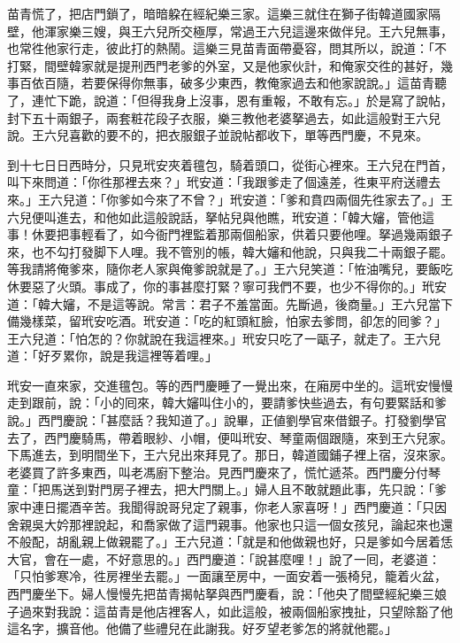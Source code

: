 苗青慌了，把店門鎖了，暗暗躱在經紀樂三家。這樂三就住在獅子街韓道國家隔壁，他渾家樂三嫂，與王六兒所交極厚，常過王六兒這邊來做伴兒。王六兒無事，也常徃他家行走，彼此打的熱鬧。這樂三見苗青面帶憂容，問其所以，說道：「不打緊，間壁韓家就是提刑西門老爹的外室，又是他家伙計，和俺家交徃的甚好，幾事百依百隨，若要保得你無事，破多少東西，教俺家過去和他家說說。」這苗青聽了，連忙下跪，說道：「但得我身上沒事，恩有重報，不敢有忘。」於是寫了說帖，封下五十兩銀子，兩套粧花段子衣服，樂三教他老婆拏過去，如此這般對王六兒說。王六兒喜歡的要不的，把衣服銀子並說帖都收下，單等西門慶，不見來。

到十七日日西時分，只見玳安夾着氊包，騎着頭口，從街心裡來。王六兒在門首，叫下來問道：「你徃那裡去來？」玳安道：「我跟爹走了個遠差，徃東平府送禮去來。」王六兒道：「你爹如今來了不曾？」玳安道：「爹和賁四兩個先徃家去了。」王六兒便叫進去，和他如此這般說話，拏帖兒與他瞧，玳安道：「韓大嬸，管他這事！休要把事輕看了，如今衙門裡監着那兩個船家，供着只要他哩。拏過幾兩銀子來，也不勾打發脚下人哩。我不管別的帳，韓大嬸和他說，只與我二十兩銀子罷。等我請將俺爹來，隨你老人家與俺爹說就是了。」王六兒笑道：「恠油嘴兒，要飯吃休要惡了火頭。事成了，你的事甚麼打緊？寧可我們不要，也少不得你的。」玳安道：「韓大嬸，不是這等說。常言：君子不羞當面。先斷過，後商量。」王六兒當下備幾樣菜，留玳安吃酒。玳安道：「吃的紅頭紅臉，怕家去爹問，卻怎的囘爹？」王六兒道：「怕怎的？你就說在我這裡來。」玳安只吃了一甌子，就走了。王六兒道：「好歹累你，說是我這裡等着哩。」

玳安一直來家，交進氊包。等的西門慶睡了一覺出來，在廂房中坐的。這玳安慢慢走到跟前，說：「小的囘來，韓大嬸叫住小的，要請爹快些過去，有句要緊話和爹說。」西門慶說：「甚麼話？我知道了。」說畢，正値劉學官來借銀子。{}打發劉學官去了，西門慶騎馬，帶着眼紗、小帽，便叫玳安、琴童兩個跟隨，來到王六兒家。下馬進去，到明間坐下，王六兒出來拜見了。那日，韓道國鋪子裡上宿，沒來家。老婆買了許多東西，叫老馮廚下整治。見西門慶來了，慌忙遞茶。西門慶分付琴童：「把馬送到對門房子裡去，把大門關上。」婦人且不敢就題此事，先只說：「爹家中連日擺酒辛苦。我聞得說哥兒定了親事，你老人家喜呀！」西門慶道：「只因舍親吳大妗那裡說起，和喬家做了這門親事。他家也只這一個女孩兒，論起來也還不般配，胡亂親上做親罷了。」王六兒道：「就是和他做親也好，只是爹如今居着恁大官，會在一處，不好意思的。」西門慶道：「說甚麼哩！」說了一囘，老婆道：「只怕爹寒冷，徃房裡坐去罷。」一面讓至房中，一面安着一張椅兒，籠着火盆，西門慶坐下。婦人慢慢先把苗青揭帖拏與西門慶看，說：「他央了間壁經紀樂三娘子過來對我說：這苗青是他店裡客人，如此這般，被兩個船家拽扯，只望除豁了他這名字，擴音他。他備了些禮兒在此謝我。好歹望老爹怎的將就他罷。」

